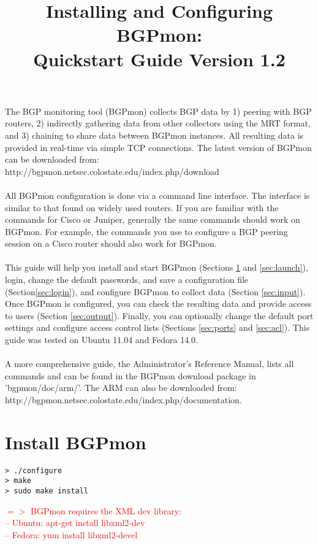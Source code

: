 \documentclass{article}
\newcommand\note[1]{\textcolor{red}{$=>$ #1}}
\begin{document}
\title{\large Installing and Configuring BGPmon:\\ 
Quickstart Guide Version 1.2\date{}}
\maketitle
\noindent

The BGP monitoring tool (BGPmon) collects BGP data by 1) peering with BGP routers,  2) indirectly gathering data from other collectors using the MRT format,  and 3) chaining to share data between BGPmon instances.   All resulting data is provided in real-time via simple TCP connections.   The latest version of BGPmon can be downloaded from:\\
http://bgpmon.netsec.colostate.edu/index.php/download
\\
\\
All BGPmon configuration is done via a command line interface.    The interface is similar to that found on widely used routers.      If you are familiar with the commands for Cisco or Juniper,  generally the same commands should work on BGPmon.  For example,   the commands you use to configure a BGP peering session on a Cisco router should also work for BGPmon. 
\\
\\
This guide will help you install and start BGPmon (Sections \ref{sec:install} and \ref{sec:launch}),  login,  change the default passwords, and save a configuration file (Section\ref{sec:login}),  and configure BGPmon to collect data (Section \ref{sec:input}).   Once BGPmon is configured,  you can check the resulting data and provide access to users (Section \ref{sec:output}).  Finally, you can optionally change the default port settings and configure access control lists (Sections \ref{sec:ports} and \ref{sec:acl}).  This guide was tested on Ubuntu 11.04 and Fedora 14.0.
\\
\\
A more comprehensive guide, the Administrator's Reference Manual,  lists all commands and can be found in the BGPmon download package in 'bgpmon/doc/arm/'. 
The ARM can also be downloaded from:\\ 
http://bgpmon.netsec.colostate.edu/index.php/documentation.

\section{Install BGPmon}
\label{sec:install}
\begin{Verbatim}[frame=single]
> ./configure
> make
> sudo make install
\end{Verbatim}
\note{BGPmon requires the XML dev library:\\
-- Ubuntu: apt-get install libxml2-dev\\
-- Fedora: yum install libxml2-devel
}
\end{document}
